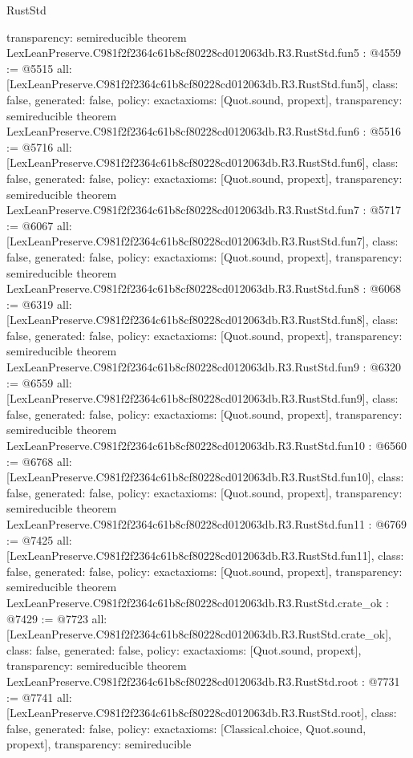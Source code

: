 \begin{lexlean}{RustStd}
\begin{coremodule}
{  transparency: semireducible
}
theorem LexLeanPreserve.C981f2f2364c61b8cf80228cd012063db.R3.RustStd.fun5 : @4559 := @5515 {
  all: [LexLeanPreserve.C981f2f2364c61b8cf80228cd012063db.R3.RustStd.fun5],
  class: false,
  generated: false,
  policy: exact{axioms: [Quot.sound, propext]},
  transparency: semireducible
}
theorem LexLeanPreserve.C981f2f2364c61b8cf80228cd012063db.R3.RustStd.fun6 : @5516 := @5716 {
  all: [LexLeanPreserve.C981f2f2364c61b8cf80228cd012063db.R3.RustStd.fun6],
  class: false,
  generated: false,
  policy: exact{axioms: [Quot.sound, propext]},
  transparency: semireducible
}
theorem LexLeanPreserve.C981f2f2364c61b8cf80228cd012063db.R3.RustStd.fun7 : @5717 := @6067 {
  all: [LexLeanPreserve.C981f2f2364c61b8cf80228cd012063db.R3.RustStd.fun7],
  class: false,
  generated: false,
  policy: exact{axioms: [Quot.sound, propext]},
  transparency: semireducible
}
theorem LexLeanPreserve.C981f2f2364c61b8cf80228cd012063db.R3.RustStd.fun8 : @6068 := @6319 {
  all: [LexLeanPreserve.C981f2f2364c61b8cf80228cd012063db.R3.RustStd.fun8],
  class: false,
  generated: false,
  policy: exact{axioms: [Quot.sound, propext]},
  transparency: semireducible
}
theorem LexLeanPreserve.C981f2f2364c61b8cf80228cd012063db.R3.RustStd.fun9 : @6320 := @6559 {
  all: [LexLeanPreserve.C981f2f2364c61b8cf80228cd012063db.R3.RustStd.fun9],
  class: false,
  generated: false,
  policy: exact{axioms: [Quot.sound, propext]},
  transparency: semireducible
}
theorem LexLeanPreserve.C981f2f2364c61b8cf80228cd012063db.R3.RustStd.fun10 : @6560 := @6768 {
  all: [LexLeanPreserve.C981f2f2364c61b8cf80228cd012063db.R3.RustStd.fun10],
  class: false,
  generated: false,
  policy: exact{axioms: [Quot.sound, propext]},
  transparency: semireducible
}
theorem LexLeanPreserve.C981f2f2364c61b8cf80228cd012063db.R3.RustStd.fun11 : @6769 := @7425 {
  all: [LexLeanPreserve.C981f2f2364c61b8cf80228cd012063db.R3.RustStd.fun11],
  class: false,
  generated: false,
  policy: exact{axioms: [Quot.sound, propext]},
  transparency: semireducible
}
theorem LexLeanPreserve.C981f2f2364c61b8cf80228cd012063db.R3.RustStd.crate_ok : @7429 := @7723 {
  all: [LexLeanPreserve.C981f2f2364c61b8cf80228cd012063db.R3.RustStd.crate_ok],
  class: false,
  generated: false,
  policy: exact{axioms: [Quot.sound, propext]},
  transparency: semireducible
}
theorem LexLeanPreserve.C981f2f2364c61b8cf80228cd012063db.R3.RustStd.root : @7731 := @7741 {
  all: [LexLeanPreserve.C981f2f2364c61b8cf80228cd012063db.R3.RustStd.root],
  class: false,
  generated: false,
  policy: exact{axioms: [Classical.choice, Quot.sound, propext]},
  transparency: semireducible
}


\end{coremodule}
\end{lexlean}
